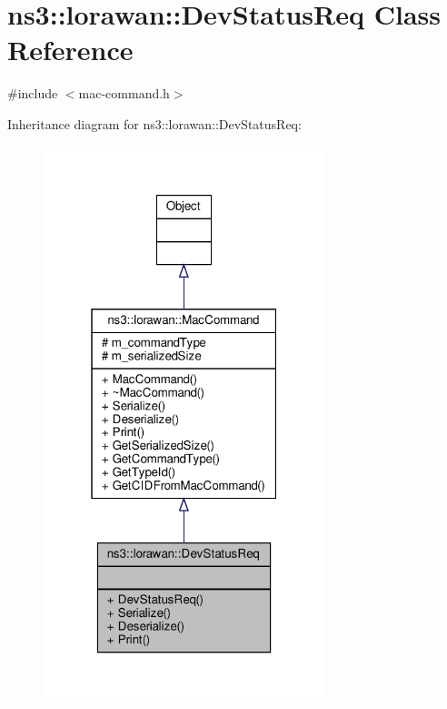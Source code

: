 \hypertarget{classns3_1_1lorawan_1_1DevStatusReq}{}\section{ns3\+:\+:lorawan\+:\+:Dev\+Status\+Req Class Reference}
\label{classns3_1_1lorawan_1_1DevStatusReq}


{\ttfamily \#include $<$mac-\/command.\+h$>$}



Inheritance diagram for ns3\+:\+:lorawan\+:\+:Dev\+Status\+Req\+:
\nopagebreak
\begin{figure}[H]
\begin{center}
\leavevmode
\includegraphics[width=232pt]{classns3_1_1lorawan_1_1DevStatusReq__inherit__graph}
\end{center}
\end{figure}


